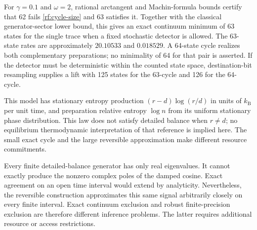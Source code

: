 For $\gamma=0.1$ and $\omega=2$, rational arctangent and Machin-formula bounds
certify that 62 fails \eqref{rf:cycle-size} and 63 satisfies it. Together with
the classical generator-sector lower bound, this gives an exact continuum
minimum of 63 states for the single trace when a fixed stochastic detector
is allowed. The 63-state rates are approximately $20.10533$ and $0.018529$.
A 64-state cycle realizes both complementary preparations; no minimality of
64 for that pair is asserted. If the detector must be deterministic within
the counted state space, destination-bit resampling supplies a lift with
125 states for the 63-cycle and 126 for the 64-cycle.

This model has stationary entropy production
$(r-d)\log(r/d)$ in units of $k_{\mathrm B}$ per unit time, and preparation
relative entropy $\log n$ from its uniform stationary phase
distribution. This law does not satisfy
detailed balance when $r\ne d$; no equilibrium thermodynamic interpretation
of that reference is implied here. The small exact cycle and the large
reversible approximation make different resource commitments.

Every finite detailed-balance generator has only real eigenvalues. It cannot
exactly produce the nonzero complex poles of the damped cosine. Exact agreement
on an open time interval would extend by analyticity. Nevertheless, the
reversible construction approximates this same signal arbitrarily closely on
every finite interval. Exact continuum exclusion and robust finite-precision
exclusion are therefore different inference problems. The latter requires
additional resource or access restrictions.
